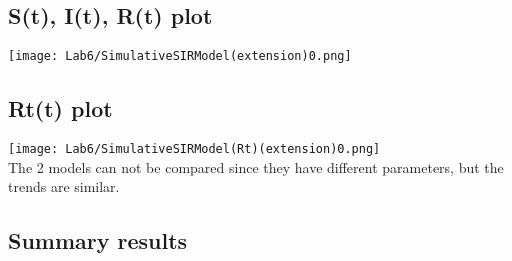 \documentclass[twocolumn,letterpaper]{report}
\begin{document}
{			\subsection{S(t), I(t), R(t) plot}
			\texttt{[image: Lab6/SimulativeSIRModel(extension)0.png]} \\
			
			\subsection{Rt(t) plot}
			 \texttt{[image: Lab6/SimulativeSIRModel(Rt)(extension)0.png]} \\
			The 2 models can not be compared since they have different parameters, but the trends are similar.
		
		\subsection{Summary results}
		
}
\end{document}
